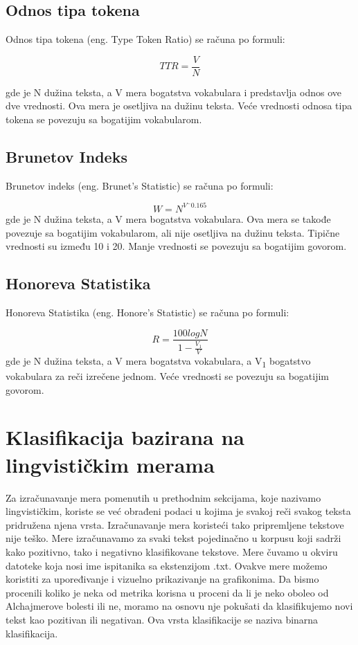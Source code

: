 \documentclass[12pt,oneside]{memoir}
\begin{document}
\subsection{Odnos tipa tokena}

Odnos tipa tokena (eng. Type Token Ratio) se računa po formuli:

\begin{equation}
	TTR = \frac{V}{N}
\end{equation}

{\setlength{\parindent}{0cm}
gde je N dužina teksta, a V mera bogatstva vokabulara i predstavlja odnos ove dve vrednosti. Ova mera je osetljiva na dužinu teksta.  Veće vrednosti odnosa tipa tokena se povezuju sa bogatijim vokabularom. 
}
\subsection{Brunetov Indeks}

Brunetov indeks (eng. Brunet's Statistic) se računa po formuli:

\begin{equation}
	W = N^{V^-0.165}
\end{equation}
{\setlength{\parindent}{0cm}
gde je N dužina teksta, a V mera bogatstva vokabulara. Ova mera se takođe povezuje sa bogatijim vokabularom, ali nije osetljiva na dužinu teksta.  Tipične vrednosti su između 10 i 20.  Manje vrednosti se povezuju sa bogatijim govorom. 
}
\subsection{Honoreva Statistika}

Honoreva Statistika (eng. Honore's Statistic) se računa po formuli:

\begin{equation}
	R = \frac{100logN}{1 - \frac{V_1}{V}}
\end{equation}
{\setlength{\parindent}{0cm}
gde je N dužina teksta, a V mera bogatstva vokabulara, a V\textsubscript{1} bogatstvo vokabulara za reči izrečene jednom.  Veće vrednosti se povezuju sa bogatijim govorom.  
}
\section{Klasifikacija bazirana na lingvističkim merama}

Za izračunavanje mera pomenutih u prethodnim sekcijama,  koje nazivamo lingvističkim,  koriste se već obrađeni podaci u kojima je svakoj reči svakog teksta pridružena njena vrsta.  Izračunavanje mera koristeći tako pripremljene tekstove nije teško.  Mere izračunavamo za svaki tekst pojedinačno u korpusu koji sadrži kako pozitivno, tako i negativno klasifikovane tekstove.  Mere čuvamo u okviru datoteke koja nosi ime ispitanika sa ekstenzijom .txt. Ovakve mere možemo koristiti za upoređivanje i vizuelno prikazivanje na grafikonima. Da bismo procenili koliko je neka od metrika korisna u proceni da li je neko oboleo od Alchajmerove bolesti ili ne,  moramo na osnovu nje pokušati da klasifikujemo novi tekst kao pozitivan ili negativan.  Ova vrsta klasifikacije se naziva binarna klasifikacija. 
\end{document}

